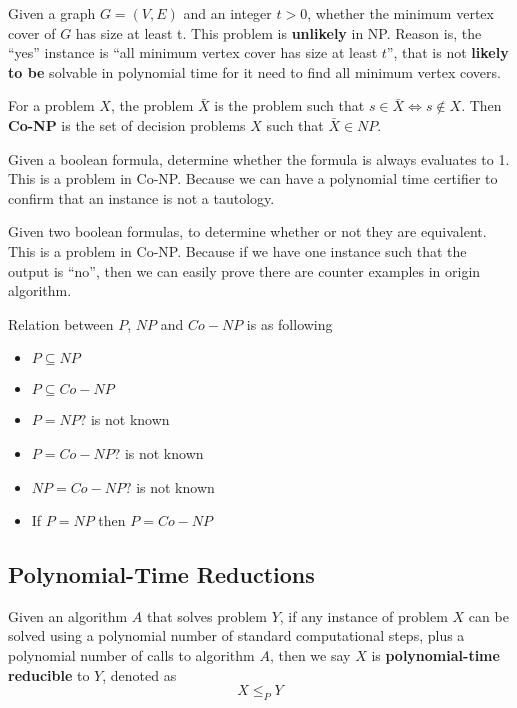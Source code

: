 					\begin{example}
						Given a graph $G = (V, E)$ and an integer $t > 0$, whether the minimum vertex cover of $G$ has size at least t. This problem is \textbf{unlikely} in NP. Reason is, the ``yes'' instance is ``all minimum vertex cover has size at least $t$'', that is not \textbf{likely to be} solvable in polynomial time for it need to find all minimum vertex covers.
					\end{example}

					\begin{definition}[Co-NP]
						For a problem $X$, the problem $\bar{X}$ is the problem such that $s \in \bar{X} \iff s \notin X$. Then \textbf{Co-NP} is the set of decision problems $X$ such that $\bar{X} \in NP$.
					\end{definition}

					\begin{example}
						Given a boolean formula, determine whether the formula is always evaluates to 1. This is a problem in Co-NP. Because we can have a polynomial time certifier to confirm that an instance is not a tautology.
					\end{example}

					\begin{example}
						Given two boolean formulas, to determine whether or not they are equivalent. This is a problem in Co-NP. Because if we have one instance such that the output is ``no'', then we can easily prove there are counter examples in origin algorithm.
					\end{example}


					Relation between $P$, $NP$ and $Co-NP$ is as following
					\begin{itemize}
						\item $P \subseteq NP$
						\item $P \subseteq Co-NP$
						\item $P = NP?$ is not known
						\item $P = Co-NP?$ is not known
						\item $NP = Co-NP?$ is not known
						\item If $P = NP$ then $P = Co-NP$
					\end{itemize}

				\subsection{Polynomial-Time Reductions}
					\begin{definition}
						Given an algorithm $A$ that solves problem $Y$, if any instance of problem $X$ can be solved using a polynomial number of standard computational steps, plus a polynomial number of calls to algorithm $A$, then we say $X$ is \textbf{polynomial-time reducible} to $Y$, denoted as 
						\begin{equation}
							X \le_P Y
						\end{equation}
					\end{definition}

